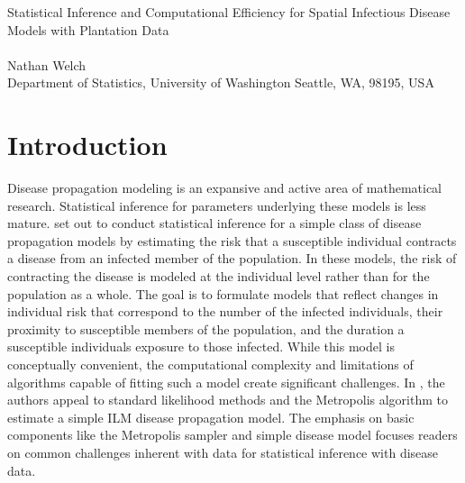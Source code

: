 \documentclass{uwstat572}
\begin{document}

\begin{center}
  {\LARGE Statistical Inference and Computational Efficiency for Spatial Infectious Disease Models with Plantation Data}\\\ \\
  {Nathan Welch \\ 
    Department of Statistics, University of Washington Seattle, WA, 98195, USA
  }
\end{center}

\begin{abstract}
This report examines the findings published in \textit{Statistical inference and computational efficiency for spatial infectious disease models with plantation data} \cite{Brown}. 
This paper aims conduct statistical inference on parameters associated with a simple individual level model. 
Model parameters are estimated using the Metropolis sampling algorithm; however, the computation burden created by fitting even a simple model leads to prohibitively long computation time. 
Statistical and computational methods to overcome the computing challenge are reviewed as a result. 
\end{abstract}

\section{Introduction}

Disease propagation modeling is an expansive and active area of mathematical research.
Statistical inference for parameters underlying these models is less mature.
\cite{Brown} set out to conduct statistical inference for a simple class of disease propagation models by estimating the risk that a susceptible individual contracts a disease from an infected member of the population. 
In these models, the risk of contracting the disease is modeled at the individual level rather than for the population as a whole. 
The goal is to formulate models that reflect changes in individual risk that correspond to the number of the infected individuals, their proximity to susceptible members of the population, and the duration a susceptible individuals  exposure to those infected. 
While this model is conceptually convenient, the computational complexity and limitations of algorithms capable of fitting such a model create significant challenges.
In \cite{Brown}, the authors appeal to standard likelihood methods and the Metropolis algorithm to estimate a simple ILM disease propagation model.
The emphasis on basic components like the Metropolis sampler and simple disease model focuses readers on common challenges inherent with data for statistical inference with disease data. 
\end{document}
